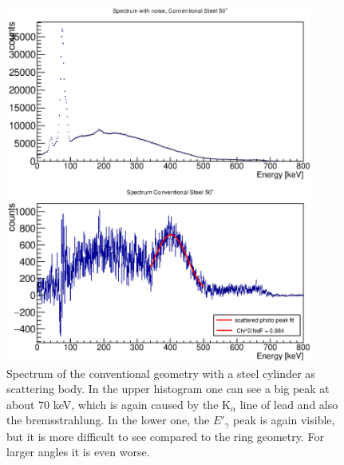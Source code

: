 \documentclass{article}
\begin{document}
\begin{figure}[H]
    \centering
    \includegraphics[width=0.9\textwidth]{Graphen/compton_spektren/50Stahl.eps}
    \caption{Spectrum of the conventional geometry with a steel cylinder as scattering body. In the upper histogram one can see a big peak at about 70 keV, which is again caused by the K$_\alpha$ line of lead and also the bremsstrahlung. In the lower one, the $E'_\gamma$ peak is again visible, but it is more difficult to see compared to the ring geometry. For larger angles it is even worse.}
\end{figure}
\end{document}
